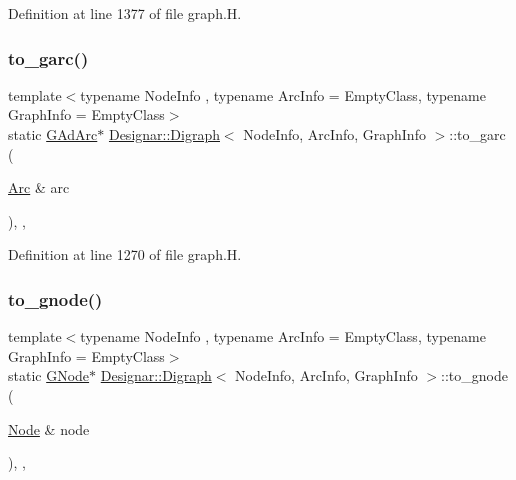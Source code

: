 Definition at line 1377 of file graph.\+H.

\mbox{\label{class_designar_1_1_digraph_a6137e6849dcb4208e9c8daa26f303868}} 
\subsubsection{\texorpdfstring{to\+\_\+garc()}{to\_garc()}}
{\footnotesize\ttfamily template$<$typename Node\+Info , typename Arc\+Info  = Empty\+Class, typename Graph\+Info  = Empty\+Class$>$ \\
static \hyperlink{class_designar_1_1_digraph_a0c6d846f23d1e82556fb6055557df53f}{G\+Ad\+Arc}$\ast$ \hyperlink{class_designar_1_1_digraph}{Designar\+::\+Digraph}$<$ Node\+Info, Arc\+Info, Graph\+Info $>$\+::to\+\_\+garc (\begin{DoxyParamCaption}\item[{\hyperlink{class_designar_1_1_digraph_a0ceb278671f2a535c00fddccdeafd69f}{Arc} \&}]{arc }\end{DoxyParamCaption})\hspace{0.3cm}{\ttfamily [inline]}, {\ttfamily [static]}, {\ttfamily [protected]}}



Definition at line 1270 of file graph.\+H.

\mbox{\label{class_designar_1_1_digraph_ae0a945e347e8e6a15df21df4fe2c1782}} 
\subsubsection{\texorpdfstring{to\+\_\+gnode()}{to\_gnode()}}
{\footnotesize\ttfamily template$<$typename Node\+Info , typename Arc\+Info  = Empty\+Class, typename Graph\+Info  = Empty\+Class$>$ \\
static \hyperlink{class_designar_1_1_digraph_a33b0d2b8820ada501522b0e67e63524a}{G\+Node}$\ast$ \hyperlink{class_designar_1_1_digraph}{Designar\+::\+Digraph}$<$ Node\+Info, Arc\+Info, Graph\+Info $>$\+::to\+\_\+gnode (\begin{DoxyParamCaption}\item[{\hyperlink{class_designar_1_1_digraph_a4dc921c41a480b7946a04170e997d8ae}{Node} \&}]{node }\end{DoxyParamCaption})\hspace{0.3cm}{\ttfamily [inline]}, {\ttfamily [static]}, {\ttfamily [protected]}}



